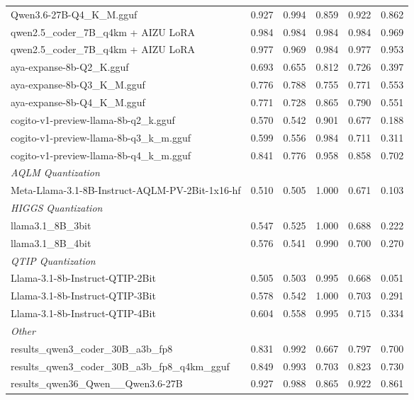 \begin{table}[htbp]
{\begin{tabular}{lrrrrr}
    Qwen3.6-27B-Q4\_K\_M.gguf & 0.927 & 0.994 & 0.859 & 0.922 & 0.862 \\
    qwen2.5\_coder\_7B\_q4km + AIZU LoRA & 0.984 & 0.984 & 0.984 & 0.984 & \cellcolor{green!50}0.969 \\
    qwen2.5\_coder\_7B\_q4km + AIZU LoRA & 0.977 & 0.969 & 0.984 & 0.977 & \cellcolor{green!30}0.953 \\
    aya-expanse-8b-Q2\_K.gguf & 0.693 & 0.655 & 0.812 & 0.726 & 0.397 \\
    aya-expanse-8b-Q3\_K\_M.gguf & 0.776 & 0.788 & 0.755 & 0.771 & 0.553 \\
    aya-expanse-8b-Q4\_K\_M.gguf & 0.771 & 0.728 & 0.865 & 0.790 & 0.551 \\
    cogito-v1-preview-llama-8b-q2\_k.gguf & 0.570 & 0.542 & 0.901 & 0.677 & 0.188 \\
    cogito-v1-preview-llama-8b-q3\_k\_m.gguf & 0.599 & 0.556 & 0.984 & 0.711 & 0.311 \\
    cogito-v1-preview-llama-8b-q4\_k\_m.gguf & 0.841 & 0.776 & 0.958 & 0.858 & 0.702 \\
    \midrule
    \multicolumn{6}{l}{\textit{AQLM Quantization}} \\
    \midrule
    Meta-Llama-3.1-8B-Instruct-AQLM-PV-2Bit-1x16-hf & 0.510 & 0.505 & 1.000 & 0.671 & 0.103 \\
    \midrule
    \multicolumn{6}{l}{\textit{HIGGS Quantization}} \\
    \midrule
    llama3.1\_8B\_3bit & 0.547 & 0.525 & 1.000 & 0.688 & 0.222 \\
    llama3.1\_8B\_4bit & 0.576 & 0.541 & 0.990 & 0.700 & 0.270 \\
    \midrule
    \multicolumn{6}{l}{\textit{QTIP Quantization}} \\
    \midrule
    Llama-3.1-8b-Instruct-QTIP-2Bit & 0.505 & 0.503 & 0.995 & 0.668 & 0.051 \\
    Llama-3.1-8b-Instruct-QTIP-3Bit & 0.578 & 0.542 & 1.000 & 0.703 & 0.291 \\
    Llama-3.1-8b-Instruct-QTIP-4Bit & 0.604 & 0.558 & 0.995 & 0.715 & 0.334 \\
    \midrule
    \multicolumn{6}{l}{\textit{Other}} \\
    \midrule
    results\_qwen3\_coder\_30B\_a3b\_fp8 & 0.831 & 0.992 & 0.667 & 0.797 & 0.700 \\
    results\_qwen3\_coder\_30B\_a3b\_fp8\_q4km\_gguf & 0.849 & 0.993 & 0.703 & 0.823 & 0.730 \\
    results\_qwen36\_Qwen\_\_Qwen3.6-27B & 0.927 & 0.988 & 0.865 & 0.922 & 0.861 \\
    \bottomrule
  \end{tabular}
  }
\end{table}

